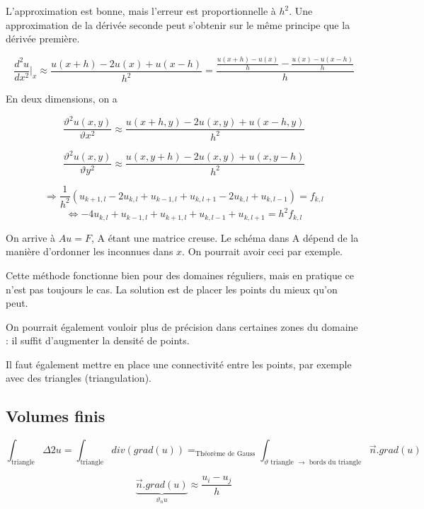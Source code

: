 	L'approximation est bonne, mais l'erreur est proportionnelle à $h^2$. Une approximation de la dérivée seconde peut s'obtenir sur le même principe que la dérivée première.
	
	$$\frac{d^2u}{dx^2}\vert_x \approx \frac{u(x + h) - 2u(x) + u(x - h)}{h^2} = \frac{\frac{u(x + h) - u(x)}{h} - \frac{u(x) - u(x - h)}{h}}{h}$$
	
	
	En deux dimensions, on a
	
	$$\frac{\vartheta^2u(x, y)}{\vartheta x^2} \approx \frac{u(x + h, y) - 2u(x, y) + u(x - h, y)}{h^2}$$
	
	$$\frac{\vartheta^2u(x, y)}{\vartheta y^2} \approx \frac{u(x, y + h) - 2u(x, y) + u(x, y - h)}{h^2}$$
	
	
	
	$$\Rightarrow \frac{1}{h^2}(u_{k + 1, l} - 2u_{k, l} + u_{k - 1, l} + u_{k, l + 1} - 2u_{k, l} + u_{k, l - 1}) = f_{k, l}$$
	$$\Leftrightarrow - 4 u_{k, l} + u_{k - 1, l} + u_{k + 1, l} + u_{k, l - 1} + u_{k, l + 1} = h^2 f_{k, l}$$
	
	
	
	On arrive à $A u = F$, A étant une matrice creuse. Le schéma dans A dépend de la manière d'ordonner les inconnues dans $x$. On pourrait avoir ceci par exemple.
	
	
	Cette méthode fonctionne bien pour des domaines réguliers, mais en pratique ce n'est pas toujours le cas. La solution est de placer les points du mieux qu'on peut.
	
	
	On pourrait également vouloir plus de précision dans certaines zones du domaine : il suffit d'augmenter la densité de points.
	
	Il faut également mettre en place une connectivité entre les points, par exemple avec des triangles (triangulation).
	
	
	\subsection{Volumes finis}
	
	$$\int_{\text{triangle}} \Delta2 u = \int_{\text{triangle}} div(grad (u)) =_{\text{Théorème de Gauss}} \int_{\vartheta \text{ triangle } \rightarrow \text{ bords du triangle}} \vec{n} . grad(u)$$
	
	$$\underbrace{\vec{n}.grad(u)}_{\vartheta_nu} \approx \frac{u_i - u_j}{h}$$
	
